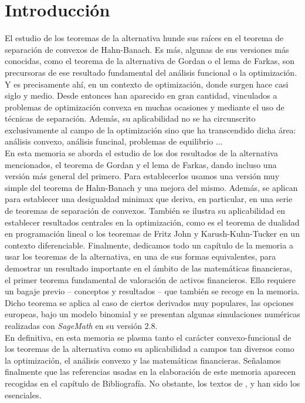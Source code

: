 \chapter{Introducción}
El estudio de los teoremas de la alternativa hunde sus raíces en el teorema de separación de convexos de Hahn-Banach. Es más, algunas de sus versiones más conocidas, como el teorema de la alternativa de Gordan o el lema de Farkas, son precursoras de ese resultado fundamental del análisis funcional o la optimización. Y es precisamente ahí, en un contexto de optimización, donde surgen hace casi siglo y medio. Desde entonces han aparecido en gran cantidad, vinculados a problemas de optimización convexa en muchas ocasiones y mediante el uso de técnicas de separación. Además, su aplicabilidad no se ha circunscrito exclusivamente al campo de la optimización sino que ha transcendido dicha área: análisis convexo, análisis funcinal, problemas de equilibrio $ \dots $ \\

En esta memoria se aborda el estudio de los dos resultados de la alternativa mencionados, el teorema de Gordan y el lema de Farkas, dando incluso una versión más general del primero. Para establecerlos usamos una versión muy simple del teorema de Hahn-Banach y una mejora del mismo. Además, se aplican para establecer una desigualdad minimax que deriva, en particular, en una serie de teoremas de separación de convexos. También se ilustra su aplicabilidad en establecer resultados centrales en la optimización, como es el teorema de dualidad en programación lineal o los teoremas de Fritz John y Karush-Kuhn-Tucker en un contexto diferenciable. Finalmente, dedicamos todo un capítulo de la memoria a usar los teoremas de la alternativa, en una de sus formas equivalentes, para demostrar un resultado importante en el ámbito de las matemáticas financieras, el primer teorema fundamental de valoración de activos financieros. Ello requiere un bagaje previo -- conceptos y resultados -- que también se recoge en la memoria. Dicho teorema se aplica al caso de ciertos derivados muy populares, las opciones europeas, bajo un modelo binomial y se presentan algunas simulaciones numéricas realizadas con \textit{SageMath} en su versión 2.8. \\

En definitiva, en esta memoria se plasma tanto el carácter convexo-funcional de los teoremas de la alternativa como su aplicabilidad a campos tan diversos como la optimización, el análisis convexo y las matemáticas financieras. Señalamos finalmente que las referencias usadas en la elaboración de este memoria aparecen recogidas en el capítulo de Bibliografía. No obstante, los textos de \cite{borwein}, \cite{elliot1999mathematics} y \cite{Simons2008} han sido los esenciales.